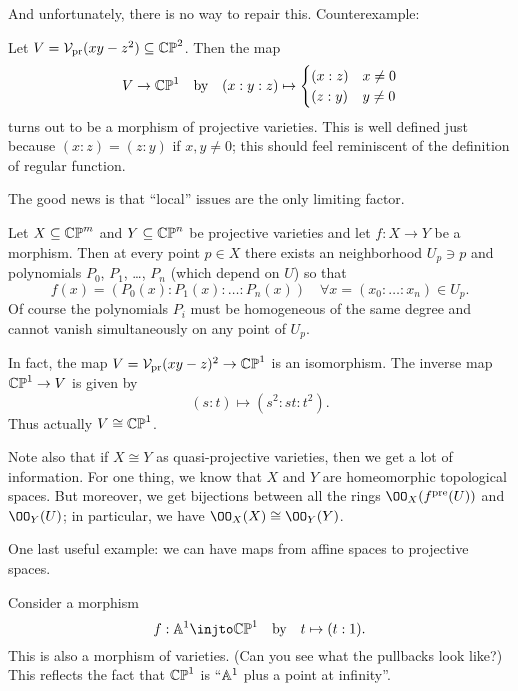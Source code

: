 \documentclass[11pt]{scrreprt}
\begin{document}
And unfortunately, there is no way to repair this.
Counterexample:
\begin{example}
	Let $V = \mathcal V_{\text{pr}}(xy-z^2) \subseteq \mathbb{CP}^2$.
	Then the map
	\[
		V \to \mathbb{CP}^1
		\quad\text{by}\quad
		(x:y:z)
		\mapsto
		\begin{cases}
			(x:z) & x \neq 0 \\
			(z:y) & y \neq 0
		\end{cases}
	\]
	turns out to be a morphism of projective varieties.
	This is well defined just because $(x:z) = (z:y)$ if $x,y \neq 0$;
	this should feel reminiscent of the definition of regular function.
\end{example}
The good news is that ``local'' issues are the only limiting factor.
\begin{theorem}
	Let $X \subseteq \mathbb{CP}^m$ and $Y \subseteq \mathbb{CP}^n$ be projective varieties
	and let $f : X \to Y$ be a morphism.
	Then at every point $p \in X$ there exists an neighborhood $U_p \ni p$
	and polynomials $P_0$, $P_1$, \dots, $P_n$ (which depend on $U$) so that
	\[ f(x) = \left( P_0(x) : P_1(x) : \dots : P_n(x) \right)
		\quad \forall x = (x_0 : \dots : x_n) \in U_p. \]
	Of course the polynomials $P_i$ must be homogeneous of the same degree
	and cannot vanish simultaneously on any point of $U_p$.
\end{theorem}
\begin{example}
	In fact, the map $V = \mathcal V_{\text{pr}}(xy-z)^2 \to \mathbb{CP}^1$ is an isomorphism.
	The inverse map $\mathbb{CP}^1 \to V$ is given by 
	\[ (s:t) \mapsto (s^2:st:t^2). \]
	Thus actually $V \cong \mathbb{CP}^1$.
\end{example}

\begin{remark}
Note also that if $X \cong Y$ as quasi-projective varieties,
then we get a lot of information.
For one thing, we know that $X$ and $Y$ are homeomorphic topological spaces.
But moreover, we get bijections between all the rings $\OO_X(f\pre(U))$
and $\OO_Y(U)$; in particular, we have $\OO_X(X) \cong \OO_Y(Y)$.
\end{remark}

One last useful example:
we can have maps from affine spaces to projective spaces.
\begin{example}
	Consider a morphism
	\[ f : \Aff^1 \injto \CP^1 \quad\text{by}\quad t \mapsto (t:1).  \]
	This is also a morphism of varieties.
	(Can you see what the pullbacks look like?)
	This reflects the fact that $\mathbb{CP}^1$ is ``$\mathbb A^1$ plus a point at infinity''.
\end{example}
\end{document}
